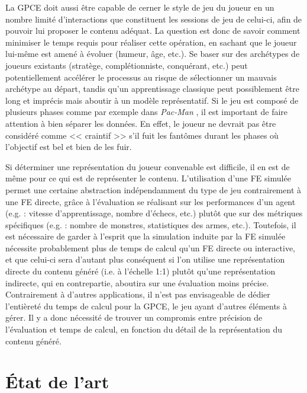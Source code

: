\documentclass[a4paper,11pt]{article}
\begin{document}
      La GPCE doit aussi être capable de cerner le style de jeu du joueur en un nombre limité d'interactions que constituent les sessions de jeu de celui-ci, afin de pouvoir lui proposer le contenu adéquat.
      La question est donc de savoir comment minimiser le temps requis pour réaliser cette opération, en sachant que le joueur lui-même est amené à évoluer (humeur, âge, etc.).
      Se baser sur des archétypes de joueurs existants (stratège, complétionniste, conquérant, etc.) \cite{Nacke} peut potentiellement accélérer le processus au risque de sélectionner un mauvais archétype au départ, tandis qu'un apprentissage classique peut possiblement être long et imprécis mais aboutir à un modèle représentatif.
      Si le jeu est composé de plusieurs phases comme par exemple dans \textit{Pac-Man} \cite{game:PacMan}, il est important de faire attention à bien séparer les données. 
      En effet, le joueur ne devrait pas être considéré comme << craintif >> s'il fuit les fantômes durant les phases où l'objectif est bel et bien de les fuir.

      Si déterminer une représentation du joueur convenable est difficile, il en est de même pour ce qui est de représenter le contenu.
      L'utilisation d'une FE simulée permet une certaine abstraction indépendamment du type de jeu contrairement à une FE directe, grâce à l'évaluation se réalisant sur les performances d'un agent (e.g. : vitesse d'apprentissage, nombre d'échecs, etc.) plutôt que sur des métriques spécifiques (e.g. : nombre de monstres, statistiques des armes, etc.).
      Toutefois, il est nécessaire de garder à l'esprit que la simulation induite par la FE simulée nécessite probablement plus de temps de calcul qu'un FE directe ou interactive, et que celui-ci sera d'autant plus conséquent si l'on utilise une représentation directe du contenu généré (i.e. à l'échelle 1:1) plutôt qu'une représentation indirecte, qui en contrepartie, aboutira sur une évaluation moins précise.
      Contrairement à d'autres applications, il n'est pas envisageable de dédier l'entièreté du temps de calcul pour la GPCE, le jeu ayant d'autres éléments à gérer. 
      Il y a donc nécessité de trouver un compromis entre précision de l'évaluation et temps de calcul, en fonction du détail de la représentation du contenu généré.

    \section{État de l'art}
\end{document}
